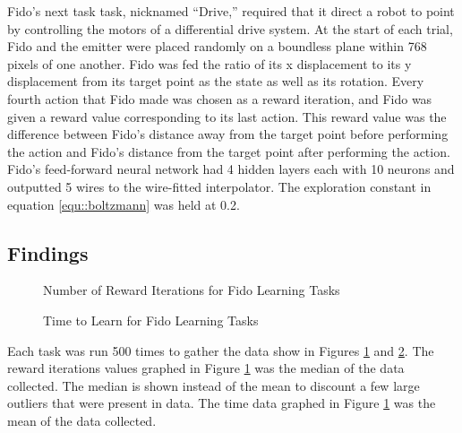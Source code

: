Fido's next task task, nicknamed ``Drive,'' required that it direct a robot to point by controlling the motors of a differential drive system. At the start of each trial, Fido and the emitter were placed randomly on a boundless plane within 768 pixels of one another. Fido was fed the ratio of its x displacement to its y displacement from its target point as the state as well as its rotation. Every fourth action that Fido made was chosen as a reward iteration, and Fido was given a reward value corresponding to its last action. This reward value was the difference between Fido's distance away from the target point before performing the action and Fido's distance from the target point after performing the action. Fido's feed-forward neural network had 4 hidden layers each with 10 neurons and outputted 5 wires to the wire-fitted interpolator. The exploration constant in equation \ref{equ::boltzmann} was held at 0.2.


\subsection{Findings}

\begin{figure}[ht]
	\centering
	
	\caption{Number of Reward Iterations for Fido Learning Tasks}
	\label{gra::rewarditerations}
\end{figure}

\begin{figure}[ht]
	\centering
	
	\caption{Time to Learn for Fido Learning Tasks}
	\label{gra::time}
\end{figure}

Each task was run 500 times to gather the data show in Figures \ref{gra::rewarditerations} and \ref{gra::time}. The reward iterations values graphed in Figure \ref{gra::rewarditerations} was the median of the data collected. The median is shown instead of the mean to discount a few large outliers that were present in data. The time data graphed in Figure \ref{gra::rewarditerations} was the mean of the data collected.